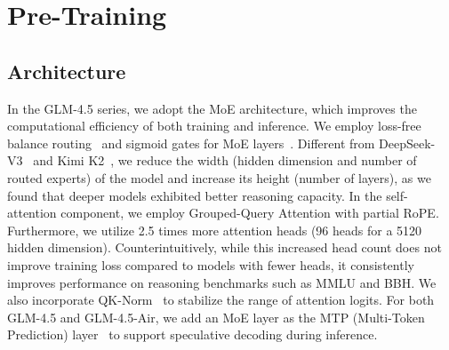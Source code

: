 \section{Pre-Training}
 
\subsection{Architecture}

In the GLM-4.5 series, we adopt the MoE architecture, which improves the computational efficiency of both training and inference. We employ loss-free balance routing~\cite{wang2024auxiliary} and sigmoid gates for MoE layers~\cite{liu2024deepseek}. Different from DeepSeek-V3~\cite{liu2024deepseek} and Kimi K2~\cite{team2025kimi}, we reduce the width (hidden dimension and number of routed experts) of the model and increase its height (number of layers), as we found that deeper models exhibited better reasoning capacity. In the self-attention component, we employ Grouped-Query Attention with partial RoPE. Furthermore, we utilize 2.5 times more attention heads (96 heads for a 5120 hidden dimension). Counterintuitively, while this increased head count does not improve training loss compared to models with fewer heads, it consistently improves performance on reasoning benchmarks such as MMLU and BBH. We also incorporate QK-Norm~\cite{henry2020querykeynormalizationtransformers} to stabilize the range of attention logits. For both GLM-4.5 and GLM-4.5-Air, we add an MoE layer as the MTP (Multi-Token Prediction) layer~\cite{gloeckle2024mtp} to support speculative decoding during inference.

